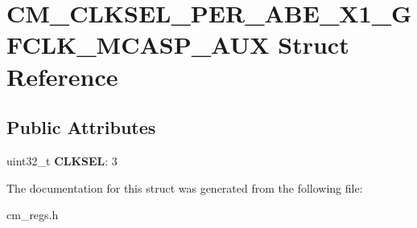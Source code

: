 \hypertarget{structCM__CLKSEL__PER__ABE__X1__GFCLK__MCASP__AUX}{\section{C\-M\-\_\-\-C\-L\-K\-S\-E\-L\-\_\-\-P\-E\-R\-\_\-\-A\-B\-E\-\_\-\-X1\-\_\-\-G\-F\-C\-L\-K\-\_\-\-M\-C\-A\-S\-P\-\_\-\-A\-U\-X Struct Reference}
\label{structCM__CLKSEL__PER__ABE__X1__GFCLK__MCASP__AUX}
}
\subsection*{Public Attributes}
\begin{DoxyCompactItemize}
\item 
\hypertarget{structCM__CLKSEL__PER__ABE__X1__GFCLK__MCASP__AUX_ad7c2523d8fb078364d51680968663e51}{uint32\-\_\-t {\bfseries C\-L\-K\-S\-E\-L}\-: 3}\label{structCM__CLKSEL__PER__ABE__X1__GFCLK__MCASP__AUX_ad7c2523d8fb078364d51680968663e51}

\end{DoxyCompactItemize}


The documentation for this struct was generated from the following file\-:\begin{DoxyCompactItemize}
\item 
cm\-\_\-regs.\-h\end{DoxyCompactItemize}
